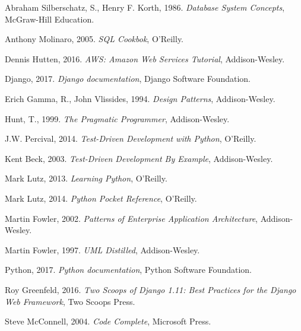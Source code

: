 \documentclass[12pt,a4paperpaper,]{report}
\begin{document}
\hypertarget{refs}{}
\hypertarget{ref-DBSConcepts}{}
Abraham Silberschatz, S., Henry F. Korth, 1986. \emph{Database System
Concepts}, McGraw-Hill Education.

\hypertarget{ref-SQLCookbook}{}
Anthony Molinaro, 2005. \emph{SQL Cookbok}, O'Reilly.

\hypertarget{ref-AWSTut}{}
Dennis Hutten, 2016. \emph{AWS: Amazon Web Services Tutorial},
Addison-Wesley.

\hypertarget{ref-STDDjango}{}
Django, 2017. \emph{Django documentation}, Django Software Foundation.

\hypertarget{ref-GoF}{}
Erich Gamma, R., John Vlissides, 1994. \emph{Design Patterns},
Addison-Wesley.

\hypertarget{ref-Pragmatic}{}
Hunt, T., 1999. \emph{The Pragmatic Programmer}, Addison-Wesley.

\hypertarget{ref-TDDPython}{}
J.W. Percival, 2014. \emph{Test-Driven Development with Python},
O'Reilly.

\hypertarget{ref-TDDExample}{}
Kent Beck, 2003. \emph{Test-Driven Development By Example},
Addison-Wesley.

\hypertarget{ref-Python}{}
Mark Lutz, 2013. \emph{Learning Python}, O'Reilly.

\hypertarget{ref-PythonPocket}{}
Mark Lutz, 2014. \emph{Python Pocket Reference}, O'Reilly.

\hypertarget{ref-EntPatterns}{}
Martin Fowler, 2002. \emph{Patterns of Enterprise Application
Architecture}, Addison-Wesley.

\hypertarget{ref-UMLDistilled}{}
Martin Fowler, 1997. \emph{UML Distilled}, Addison-Wesley.

\hypertarget{ref-STDPython}{}
Python, 2017. \emph{Python documentation}, Python Software Foundation.

\hypertarget{ref-2Scoops}{}
Roy Greenfeld, 2016. \emph{Two Scoops of Django 1.11: Best Practices for
the Django Web Framework}, Two Scoops Press.

\hypertarget{ref-CodeComplete}{}
Steve McConnell, 2004. \emph{Code Complete}, Microsoft Press.
\end{document}

